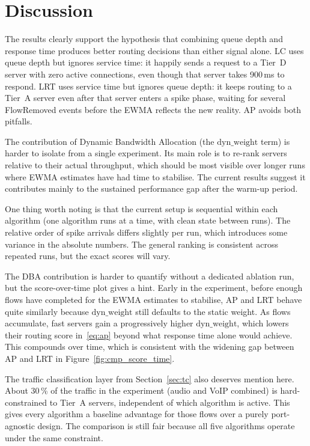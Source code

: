 \documentclass[10pt,a4paper,twocolumn]{article}
\numberwithin{figure}{section}
\numberwithin{table}{section}
\numberwithin{equation}{section}
\begin{document}
\section{Discussion}
\label{sec:discussion}

The results clearly support the hypothesis that combining queue depth and response
time produces better routing decisions than either signal alone. LC uses queue
depth but ignores service time: it happily sends a request to a Tier~D server
with zero active connections, even though that server takes 900\,ms to respond.
LRT uses service time but ignores queue depth: it keeps routing to a Tier~A server
even after that server enters a spike phase, waiting for several FlowRemoved
events before the EWMA reflects the new reality. AP avoids both pitfalls.

The contribution of Dynamic Bandwidth Allocation (the $\text{dyn\_weight}$ term)
is harder to isolate from a single experiment. Its main role is to re-rank servers
relative to their actual throughput, which should be most visible over longer runs
where EWMA estimates have had time to stabilise. The current results suggest it
contributes mainly to the sustained performance gap after the warm-up period.

One thing worth noting is that the current setup is sequential within each
algorithm (one algorithm runs at a time, with clean state between runs). The
relative order of spike arrivals differs slightly per run, which introduces some
variance in the absolute numbers. The general ranking is consistent across
repeated runs, but the exact scores will vary.

The DBA contribution is harder to quantify without a dedicated ablation run,
but the score-over-time plot gives a hint. Early in the experiment, before
enough flows have completed for the EWMA estimates to stabilise, AP and LRT
behave quite similarly because $\text{dyn\_weight}$ still defaults to the static
weight. As flows accumulate, fast servers gain a progressively higher
$\text{dyn\_weight}$, which lowers their routing score in~\eqref{eq:ap} beyond
what response time alone would achieve. This compounds over time, which is
consistent with the widening gap between AP and LRT in
Figure~\ref{fig:cmp_score_time}.

The traffic classification layer from Section~\ref{sec:tc} also deserves mention
here. About 30\,\% of the traffic in the experiment (audio and VoIP combined)
is hard-constrained to Tier~A servers, independent of which algorithm is active.
This gives every algorithm a baseline advantage for those flows over a
purely port-agnostic design. The comparison is still fair because all five
algorithms operate under the same constraint.
\end{document}
